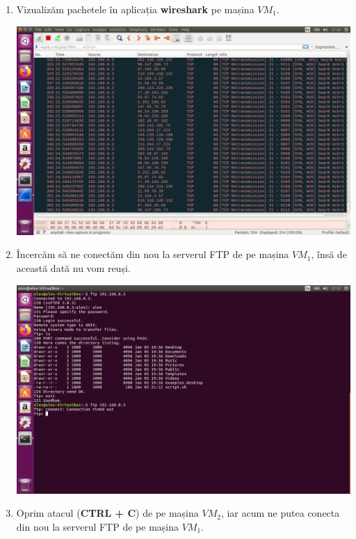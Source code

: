 \documentclass[a4paper]{article}
\begin{document}
\begin{enumerate}
    \item Vizualizăm pachetele în aplicația \textbf{wireshark} pe mașina $ VM_1 $.
    
    \begin{center}
        \hspace*{-1.8cm}                                           \includegraphics[scale=0.64]{"./img/pas6.png"}       
    \end{center}
    
    \item Încercăm să ne conectăm din nou la serverul FTP de pe mașina $ VM_1 $, însă de această dată nu vom reuși.
    
    \begin{center}
        \hspace*{-1.8cm}                                          \includegraphics[scale=0.64]{"./img/pas5.png"}       
    \end{center}
    
    \item Oprim atacul (\textbf{CTRL + C}) de pe mașina $ VM_2 $, iar acum ne putea conecta din nou la serverul FTP de pe mașina $ VM_1 $.
    

\end{enumerate}
\end{document}

